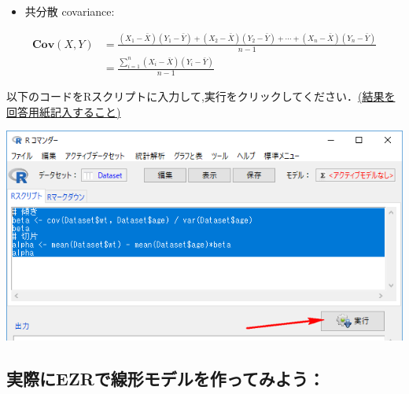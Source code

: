 \documentclass[11pt,]{problemset}
\newenvironment{Shaded}{\begin{snugshade}}{\end{snugshade}}
\newcommand{\CommentTok}[1]{\textcolor[rgb]{0.56,0.35,0.01}{\textit{#1}}}
\newcommand{\KeywordTok}[1]{\textcolor[rgb]{0.13,0.29,0.53}{\textbf{#1}}}
\newcommand{\NormalTok}[1]{#1}
\newcommand{\OperatorTok}[1]{\textcolor[rgb]{0.81,0.36,0.00}{\textbf{#1}}}
\newcommand{\StringTok}[1]{\textcolor[rgb]{0.31,0.60,0.02}{#1}}
\providecommand{\tightlist}{%
  \setlength{\itemsep}{0pt}\setlength{\parskip}{0pt}}
\begin{document}
\begin{itemize}
\tightlist
\item
  共分散 covariance:
\end{itemize}

\[
\begin{aligned}
\mathbf{Cov}(X, Y) & = \frac{(X_1 - \bar{X})(Y_1-\bar{Y}) + (X_2 - \bar{X})(Y_2-\bar{Y}) + \cdots + (X_n - \bar{X})(Y_n-\bar{Y})}{n - 1} \\
                   & = \frac{\sum_{i = 1}^n(X_i - \bar{X})(Y_i-\bar{Y})}{n - 1}
\end{aligned}
\]

以下のコードをRスクリプトに入力して,実行をクリックしてください．\underline{(結果を回答用紙記入すること)}

\begin{Shaded}
\end{Shaded}

\begin{center}\includegraphics[width=0.8\linewidth]{pic/betaalpha} \end{center}

\hypertarget{ezr}{%
\subsection{実際にEZRで線形モデルを作ってみよう：}\label{ezr}}
\end{document}
